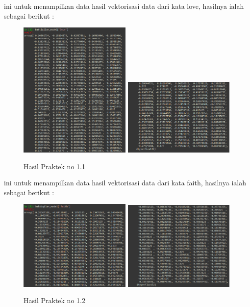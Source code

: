 
ini untuk menampilkan data hasil vektorisasi data dari kata love, hasilnya ialah sebagai berikut :
\begin{figure}[H]
	\centering
	\includegraphics[width=5.5cm]{figures/1174083/figures5/8.png}
	\includegraphics[width=5.5cm]{figures/1174083/figures5/9.png}
	\caption{Hasil Praktek no 1.1}
\end{figure}


ini untuk menampilkan data hasil vektorisasi data dari kata faith, hasilnya ialah sebagai berikut :
\begin{figure}[H]
	\centering
	\includegraphics[width=5.5cm]{figures/1174083/figures5/10.png}
	\includegraphics[width=5.5cm]{figures/1174083/figures5/11.png}
	\caption{Hasil Praktek no 1.2}
\end{figure}

